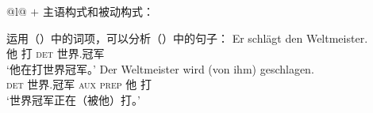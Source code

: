 \ex
\label{ex-schlagen-passive}
\begin{tabular}[t]{@{}l@{}}
 $+$ 主语构式和被动构式：\\
\end{tabular}
\zl
运用（）中的词项，可以分析（）中的句子：
\eal
\label{ex-cxg-weltmeister}
\ex 
\gll Er schlägt den Weltmeister.\\
	 他 打 \textsc{det} 世界.冠军\\
\glt `他在打世界冠军。'
\ex 
\gll Der Weltmeister wird (von ihm) geschlagen.\\
     \textsc{det} 世界.冠军 \textsc{aux} \spacebr{}\textsc{prep} 他 打\\
\glt `世界冠军正在（被他）打。'
\zl

